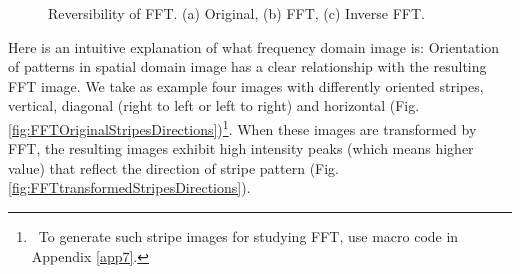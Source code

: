 \begin{figure}[htbp]
 \centering
 \caption{ Reversibility of FFT. (a) Original, (b) FFT, (c) Inverse FFT.}
 \label{fig:FFTreversibility}
\end{figure} 

Here is an intuitive explanation of what frequency domain image is:
Orientation of patterns in spatial domain image has a clear
relationship with the resulting FFT image. We take as example four images
with differently oriented stripes, vertical, diagonal (right to left or
left to right) and horizontal (Fig. \ref{fig:FFTOriginalStripesDirections})\footnote{\ To generate such stripe images for studying FFT, use macro code in Appendix \ref{app7}. }. When
these images are transformed by FFT, the resulting images exhibit high
intensity peaks (which means higher value) that reflect the direction 
of stripe pattern (Fig. \ref{fig:FFTtransformedStripesDirections}). 

